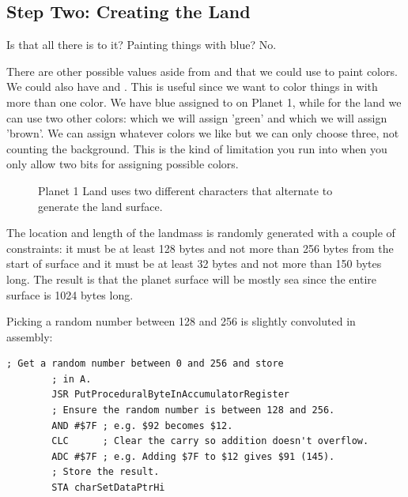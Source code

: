 

\subsection{Step Two: Creating the Land}

Is that all there is to it? Painting things with blue? No. 

There are other possible values aside from  and  that we
could use to paint colors. We could also have  and . This
is useful since we want to color things in with more than one color. We have
blue assigned to  on Planet 1, while for the land we can use two
other colors:  which we will assign 'green' and  which we
will assign 'brown'. We can assign whatever colors we like but we can only
choose three, not counting the background. This is the kind of limitation you
run into when you only allow two bits for assigning possible colors.

\begin{figure}[H]
{
  \setlength{\tabcolsep}{3.0pt}
  \setlength\cmidrulewidth{\heavyrulewidth} %
    \begin{adjustbox}{width=10cm,center}
  \begin{subfigure}{0.3\textwidth}
  
  \end{subfigure}
  \begin{subfigure}{0.3\textwidth}
  
  \end{subfigure}
  \end{adjustbox}
}\caption[]{Planet 1 Land uses two different characters that alternate to generate the land surface.}
\end{figure}


The location and length of the landmass is randomly generated with a couple of constraints:
it must be at least 128 bytes  and not more than 256 bytes from the start of surface and it must be at least 32 bytes
and not more than 150 bytes long. The result is that the planet surface will be mostly sea
since the entire surface is 1024 bytes long.

Picking a random number between 128 and 256 is slightly convoluted in assembly:

\begin{lstlisting}[caption=Convoluted.]
        ; Get a random number between 0 and 256 and store
        ; in A.
        JSR PutProceduralByteInAccumulatorRegister
        ; Ensure the random number is between 128 and 256.
        AND #$7F ; e.g. $92 becomes $12.
        CLC      ; Clear the carry so addition doesn't overflow.
        ADC #$7F ; e.g. Adding $7F to $12 gives $91 (145).
        ; Store the result.
        STA charSetDataPtrHi
\end{lstlisting}

